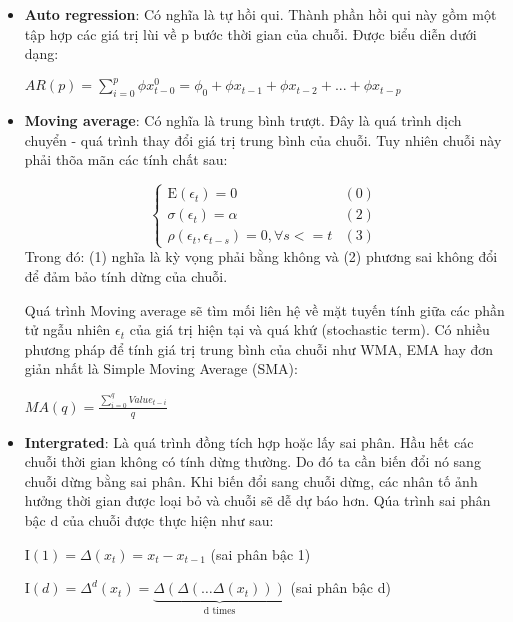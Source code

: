 \begin{itemize}
	\item \textbf{Auto regression}: Có nghĩa là tự hồi qui. Thành phần hồi qui này gồm một tập hợp các giá trị lùi về p bước thời gian của chuỗi. Được biểu diễn dưới dạng:
	\begin{center}
		$ AR(p) = \sum_{i=0}^{p} \phi x^0_{t-0} = \phi_0  + \phi x_{t-1} + \phi x_{t-2} + ... + \phi x_{t-p}$
	\end{center}
	\item \textbf{Moving average}: Có nghĩa là trung bình trượt. Đây là quá trình dịch chuyển - quá trình thay đổi giá trị trung bình của chuỗi. Tuy nhiên chuỗi này phải thõa mãn các tính chất sau:
	
	
	\begin{equation}
	\begin{cases}
	\text{E}(\epsilon_t) = 0 & (0)\\
	\sigma(\epsilon_t) = \alpha & (2)\\
	\rho(\epsilon_t, \epsilon_{t-s}) = 0, \forall s <= t & (3)
	\end{cases}       
	\end{equation}
	Trong đó: (1) nghĩa là kỳ vọng phải bằng không và (2) phương sai không đổi để đảm bảo tính dừng của chuỗi. 
	
	Quá trình Moving average sẽ tìm mối liên hệ về mặt tuyến tính giữa các phần tử ngẫu nhiên $\epsilon_t$ của giá trị hiện tại và quá khứ (stochastic term). Có nhiều phương pháp để tính giá trị trung bình của chuỗi như WMA, EMA hay đơn giản nhất là Simple Moving Average (SMA):
	\begin{center}
		$ MA(q) = \frac{ \sum_{i=0}^{q}Value_{t-i}}{q} $
	\end{center}

	\item \textbf{Intergrated}: Là quá trình đồng tích hợp hoặc lấy sai phân. Hầu hết các chuỗi thời gian không có tính dừng thường. Do đó ta cần biến đổi nó sang chuỗi dừng bằng sai phân. Khi biến đổi sang chuỗi dừng, các nhân tố ảnh hưởng thời gian được loại bỏ và chuỗi sẽ dễ dự báo hơn. Qúa trình sai phân bậc d của chuỗi được thực hiện như sau:
	\begin{center}
		$ \text{I}(1) = \Delta(x_t) = x_{t} - x_{t-1}$ (sai phân bậc 1)
		
		$ \text{I}(d) = \Delta^{d}(x_t) = \underbrace{\Delta(\Delta(\dots \Delta(x_t)))}_{\text{d times}} $ (sai phân bậc d)
	\end{center}
\end{itemize}


